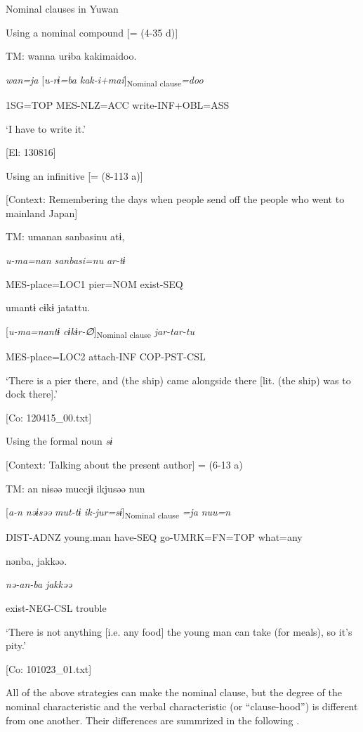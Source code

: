 \ea\label{ex:11-4}  Nominal clauses in Yuwan

  \ea Using a nominal compound [= (4-35 d)]

  TM:  wanna  urɨba  kakimaidoo.

    \textit{wan=ja}  [\textit{u-rɨ=ba}  \textit{kak-i+mai}]\textsubscript{Nominal clause}\textit{=doo}

    1SG=TOP  MES-NLZ=ACC  write-INF+OBL=ASS

    ‘I have to write it.’

    [El: 130816]

  \ex Using an infinitive [= (8-113 a)]

  [Context: Remembering the days when people send off the people who went to mainland Japan]

  TM:  umanan  sanbasinu  atɨ,

    \textit{u-ma=nan}  \textit{sanbasi=nu}  \textit{ar-tɨ}

    MES-place=LOC1  pier=NOM  exist-SEQ

    umantɨ  cɨkɨ  jatattu.

    [\textit{u-ma=nantɨ}  \textit{cɨkɨr-∅}]\textsubscript{Nominal clause}  \textit{jar-tar-tu}

    MES-place=LOC2  attach-INF  COP-PST-CSL

    ‘There is a pier there, and (the ship) came alongside there [lit. (the ship) was to dock there].’

    [Co: 120415\_00.txt]

  \ex Using the formal noun \textit{sɨ}

  [Context: Talking about the present author] = (6-13 a)

  TM:  an  nɨsəə  muccjɨ  ikjusəə  nun

    [\textit{a-n}  \textit{nəɨsəə}  \textit{mut-tɨ}  \textit{ik-jur=sɨ}]\textsubscript{Nominal clause} \textit{=ja}  \textit{nuu=n}

    DIST-ADNZ  young.man  have-SEQ  go-UMRK=FN=TOP  what=any

    nənba,  jakkəə.

    \textit{nə-an-ba}  \textit{jakkəə}

    exist-NEG-CSL  trouble

    ‘There is not anything [i.e. any food] the young man can take (for meals), so it’s pity.’

    [Co: 101023\_01.txt]
\z
\z

All of the above strategies can make the nominal clause, but the degree of the nominal characteristic and the verbal characteristic (or “clause-hood”) is different from one another. Their differences are summrized in the following .

